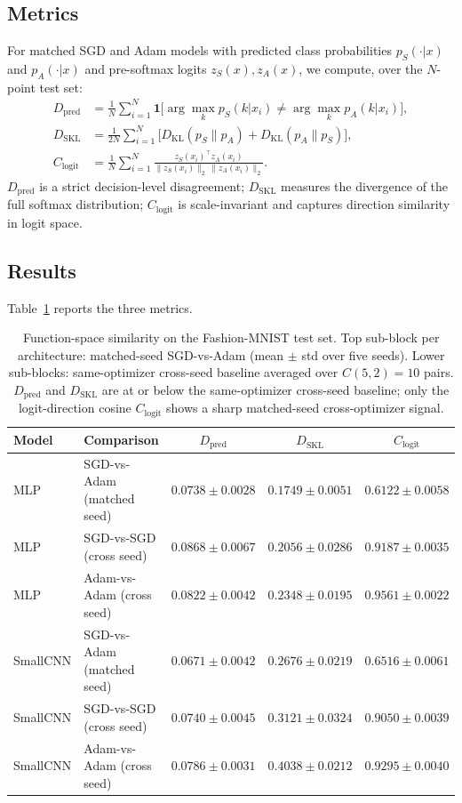 \subsection{Metrics}

For matched SGD and Adam models with predicted class probabilities $p_S(\cdot|x)$ and $p_A(\cdot|x)$ and pre-softmax logits $z_S(x), z_A(x)$, we compute, over the $N$-point test set:
\begin{align}
D_{\mathrm{pred}} &= \frac{1}{N}\sum_{i=1}^N \mathbf{1}\!\big[\arg\max_k p_S(k|x_i)\ne \arg\max_k p_A(k|x_i)\big],\\
D_{\mathrm{SKL}} &= \frac{1}{2N}\sum_{i=1}^N \big[D_{\mathrm{KL}}(p_S\|p_A) + D_{\mathrm{KL}}(p_A\|p_S)\big],\\
C_{\mathrm{logit}} &= \frac{1}{N}\sum_{i=1}^N \frac{z_S(x_i)^\top z_A(x_i)}{\|z_S(x_i)\|_2\,\|z_A(x_i)\|_2}.
\end{align}
$D_{\mathrm{pred}}$ is a strict decision-level disagreement; $D_{\mathrm{SKL}}$ measures the divergence of the full softmax distribution; $C_{\mathrm{logit}}$ is scale-invariant and captures direction similarity in logit space.

\subsection{Results}

Table~\ref{tab:function-space} reports the three metrics.

\begin{table}[H]
\centering
\small
\begin{tabular}{llccc}
\toprule
\textbf{Model} & \textbf{Comparison} & $D_{\mathrm{pred}}$ & $D_{\mathrm{SKL}}$ & $C_{\mathrm{logit}}$ \\
\midrule
MLP      & SGD-vs-Adam (matched seed) & $0.0738 \pm 0.0028$ & $0.1749 \pm 0.0051$ & $0.6122 \pm 0.0058$ \\
MLP      & SGD-vs-SGD (cross seed)    & $0.0868 \pm 0.0067$ & $0.2056 \pm 0.0286$ & $0.9187 \pm 0.0035$ \\
MLP      & Adam-vs-Adam (cross seed)  & $0.0822 \pm 0.0042$ & $0.2348 \pm 0.0195$ & $0.9561 \pm 0.0022$ \\
\addlinespace
SmallCNN & SGD-vs-Adam (matched seed) & $0.0671 \pm 0.0042$ & $0.2676 \pm 0.0219$ & $0.6516 \pm 0.0061$ \\
SmallCNN & SGD-vs-SGD (cross seed)    & $0.0740 \pm 0.0045$ & $0.3121 \pm 0.0324$ & $0.9050 \pm 0.0039$ \\
SmallCNN & Adam-vs-Adam (cross seed)  & $0.0786 \pm 0.0031$ & $0.4038 \pm 0.0212$ & $0.9295 \pm 0.0040$ \\
\bottomrule
\end{tabular}
\caption{Function-space similarity on the Fashion-MNIST test set. Top sub-block per architecture: matched-seed SGD-vs-Adam (mean $\pm$ std over five seeds). Lower sub-blocks: same-optimizer cross-seed baseline averaged over $C(5,2)=10$ pairs. $D_{\mathrm{pred}}$ and $D_{\mathrm{SKL}}$ are at or below the same-optimizer cross-seed baseline; only the logit-direction cosine $C_{\mathrm{logit}}$ shows a sharp matched-seed cross-optimizer signal.}
\label{tab:function-space}
\end{table}


